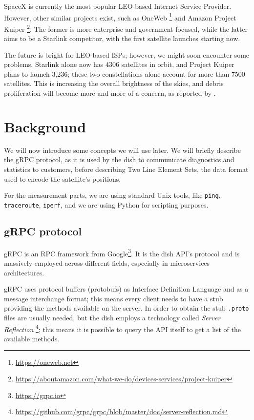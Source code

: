 \documentclass[IN,11pt,twoside,openright,idp,english]{tumthesis}
\begin{document}
SpaceX is currently the most popular LEO-based Internet Service Provider. However, other similar projects exist, such as OneWeb \footnote{\url{https://oneweb.net}} and Amazon Project Kuiper \footnote{\url{https://aboutamazon.com/what-we-do/devices-services/project-kuiper}}. The former is more enterprise and government-focused, while the latter aims to be a Starlink competitor, with the first satellite launches starting now.

The future is bright for LEO-based ISPs; however, we might soon encounter some problems. Starlink alone now has 4306 satellites in orbit, and Project Kuiper plans to launch 3,236; these two constellations alone account for more than 7500 satellites. This is increasing the overall brightness of the skies, and debris proliferation will become more and more of a concern, as reported by \cite{cite-key}.
    
\section{Background}

We will now introduce some concepts we will use later. We will briefly describe the gRPC protocol, as it is used by the dish to communicate diagnostics and statistics to customers, before describing Two Line Element Sets, the data format used to encode the satellite's positions. 

For the measurement parts, we are using standard Unix tools, like \texttt{ping}, \texttt{traceroute}, \texttt{iperf}, and we are using Python for scripting purposes.
    
\subsection{gRPC protocol}
    
gRPC is an RPC framework from Google\footnote{\url{https://grpc.io}}. It is the dish API's protocol and is massively employed across different fields, especially in microservices architectures. 
    
gRPC uses protocol buffers (protobufs) as Interface Definition Language and as a message interchange format; this means every client needs to have a stub providing the methods available on the server. In order to obtain the stub \texttt{.proto} files are usually needed, but the dish employs a technology called \textit{Server Reflection} \footnote{\url{https://github.com/grpc/grpc/blob/master/doc/server-reflection.md}}; this means it is possible to query the API itself to get a list of the available methods.
\end{document}
